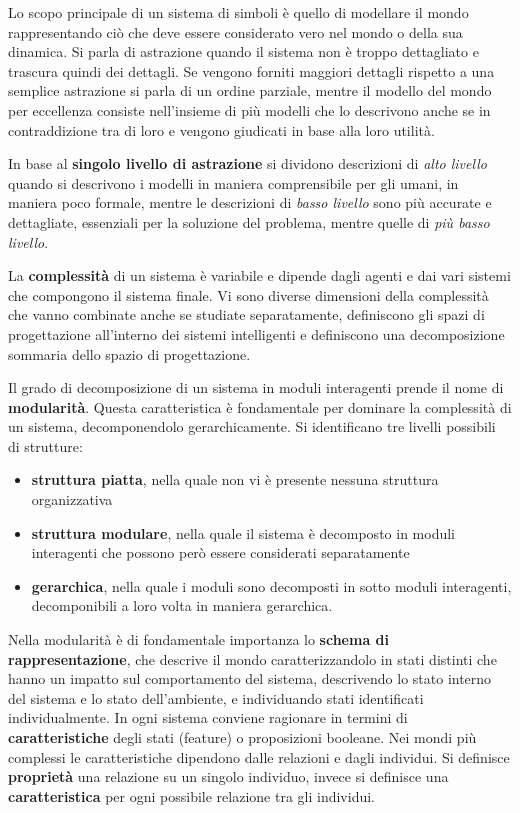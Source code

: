 \documentclass[a4paper]{extarticle}
\begin{document}
Lo scopo principale di un sistema di simboli è quello di modellare il mondo rappresentando ciò che deve essere considerato vero nel mondo o della sua dinamica. Si parla di astrazione quando il sistema non è troppo dettagliato e trascura quindi dei dettagli. Se vengono forniti maggiori dettagli rispetto a una semplice astrazione si parla di un ordine parziale, mentre il modello del mondo per eccellenza consiste nell'insieme di più modelli che lo descrivono anche se in contraddizione tra di loro e vengono giudicati in base alla loro utilità.

In base al \textbf{singolo livello di astrazione} si dividono descrizioni di \textit{alto livello} quando si descrivono i modelli in maniera comprensibile per gli umani, in maniera poco formale, mentre le descrizioni di \textit{basso livello} sono più accurate e dettagliate, essenziali per la soluzione del problema, mentre quelle di \textit{più basso livello}.

La \textbf{complessità} di un sistema è variabile e dipende dagli agenti e dai vari sistemi che compongono il sistema finale. Vi sono diverse dimensioni della complessità che vanno combinate anche se studiate separatamente, definiscono gli spazi di progettazione all'interno dei sistemi intelligenti e definiscono una decomposizione sommaria dello spazio di progettazione.

Il grado di decomposizione di un sistema in moduli interagenti prende il nome di \textbf{modularità}. Questa caratteristica è fondamentale per dominare la complessità di un sistema, decomponendolo gerarchicamente. Si identificano tre livelli possibili di strutture:
\begin{itemize}
\item \textbf{struttura piatta}, nella quale non vi è presente nessuna struttura organizzativa
\item \textbf{struttura modulare}, nella quale il sistema è decomposto in moduli interagenti che possono però essere considerati separatamente
\item \textbf{gerarchica}, nella quale i moduli sono decomposti in sotto moduli interagenti, decomponibili a loro volta in maniera gerarchica.
\end{itemize}
Nella modularità è di fondamentale importanza lo \textbf{schema di rappresentazione}, che descrive il mondo caratterizzandolo in stati distinti che hanno un impatto sul comportamento del sistema, descrivendo lo stato interno del sistema e lo stato dell'ambiente, e individuando stati identificati individualmente.
In ogni sistema conviene ragionare in termini di \textbf{caratteristiche} degli stati (feature) o proposizioni booleane. Nei mondi più complessi le caratteristiche dipendono dalle relazioni e dagli individui. Si definisce \textbf{proprietà} una relazione su un singolo individuo, invece si definisce una \textbf{caratteristica} per ogni possibile relazione tra gli individui.
\end{document}

